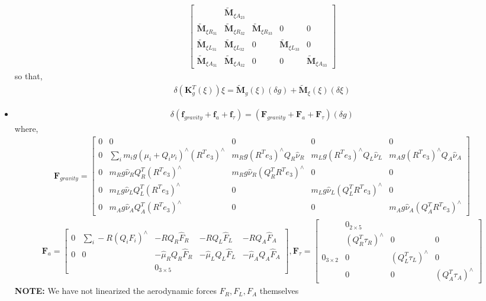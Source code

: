 \documentclass[10pt]{article}
\begin{document}
\begin{itemize}
\begin{align*}
\begin{bmatrix}
	& \tilde{\mathbf{M}}_{\xi A_{23}} \\
	\tilde{\mathbf{M}}_{\xi R_{31}} & \tilde{\mathbf{M}}_{\xi R_{32}} &  \tilde{\mathbf{M}}_{\xi R_{33}}
	& 0 & 0 \\
	\tilde{\mathbf{M}}_{\xi L_{31}} & \tilde{\mathbf{M}}_{\xi L_{32}} & 0
	& \tilde{\mathbf{M}}_{\xi L_{33}} & 0 \\
	\tilde{\mathbf{M}}_{\xi A_{31}} & \tilde{\mathbf{M}}_{\xi A_{32}} & 0 & 0 & \tilde{\mathbf{M}}_{\xi A_{33}}
	\end{bmatrix}
	\end{align*}
	so that,
	\begin{align*}
	\delta(\mathbf{K}^T_g(\xi)) \xi = \tilde{\mathbf{M}}_g(\xi) (\delta g) + \tilde{\mathbf{M}}_\xi(\xi) (\delta \xi)
	\end{align*}
	\item \begin{align*}
	\delta (\mathbf{f}_{gravity} + \mathbf{f}_a + \mathbf{f}_\tau) = (\mathbf{F}_{gravity} + \mathbf{F}_a + \mathbf{F}_\tau) (\delta g)
	\end{align*}
	where,
	{\small \begin{align*}
	\mathbf{F}_{gravity} = \begin{bmatrix}
	0 & 0 & 0 & 0 & 0 \\
	0 & \sum_{i} m_i g (\mu_i + Q_i \nu_i)^\wedge (R^T e_3)^\wedge & m_Rg (R^T e_3)^\wedge Q_R \hat{\nu}_R & m_Lg (R^T e_3)^\wedge Q_L \hat{\nu}_L & m_Ag (R^T e_3)^\wedge Q_A \hat{\nu}_A \\
	0 & m_R g \hat\nu_R Q_R^T (R^T e_3)^\wedge & m_R g \hat\nu_R (Q_R^T R^T e_3)^\wedge & 0 & 0\\
	0 & m_L g \hat\nu_L Q_L^T (R^T e_3)^\wedge & 0 & m_L g \hat\nu_L (Q_L^T R^T e_3)^\wedge & 0 \\
	0 & m_A g \hat\nu_A Q_A^T (R^T e_3)^\wedge & 0 & 0 & m_A g \hat\nu_A (Q_A^T R^T e_3)^\wedge
	\end{bmatrix}
	\end{align*}
	\begin{align*}
	\mathbf{F}_a =  \begin{bmatrix}
	0 & \sum_{i} -R(Q_i F_i)^\wedge & -RQ_R\hat{F}_R & -RQ_L\hat{F}_L & -RQ_A\hat{F}_A \\
	0 & 0 & -\hat{\mu}_R Q_R \hat{F}_R & -\hat{\mu}_L Q_L \hat{F}_L & -\hat{\mu}_A Q_A \hat{F}_A\\
	& & 0_{3 \times 5} & &
	\end{bmatrix}
	,\mathbf{F}_\tau = \begin{bmatrix}
	& 0_{2\times 5} &  &  \\
	& (Q_R^T \tau_R)^\wedge & 0 & 0 \\
	0_{3 \times 2} & 0 & (Q_L^T \tau_L)^\wedge & 0 \\
	&  0 & 0 & (Q_A^T \tau_A)^\wedge
	\end{bmatrix}
	\end{align*}}
	\textbf{NOTE:} We have not linearized the aerodynamic forces $ F_R, F_L, F_A $ themselves
\end{itemize}
\end{document}
